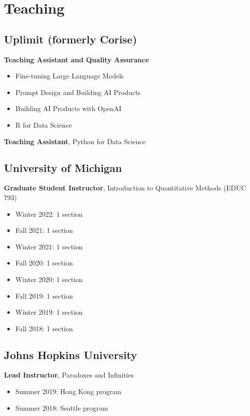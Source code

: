 \usepackage{enumitem}

\section*{Teaching}

\subsection*{Uplimit (formerly Corise)}

 \textbf{Teaching Assistant and Quality Assurance}
\begin{itemize}
    \item Fine-tuning Large Language Models
    \item Prompt Design and Building AI Products
    \item Building AI Products with OpenAI
    \item R for Data Science
\end{itemize}
 \textbf{Teaching Assistant}, Python for Data Science

\subsection*{University of Michigan}

 \textbf{Graduate Student Instructor}, Introduction to Quantitative Methods (EDUC 793)
\begin{itemize}
    \item Winter 2022: 1 section
    \item Fall 2021: 1 section
    \item Winter 2021: 1 section
    \item Fall 2020: 1 section
    \item Winter 2020: 1 section
    \item Fall 2019: 1 section
    \item Winter 2019: 1 section
    \item Fall 2018: 1 section
\end{itemize}

\subsection*{Johns Hopkins University}

 \textbf{Lead Instructor}, Paradoxes and Infinities
\begin{itemize}
    \item Summer 2019: Hong Kong program
    \item Summer 2018: Seattle program
\end{itemize}


